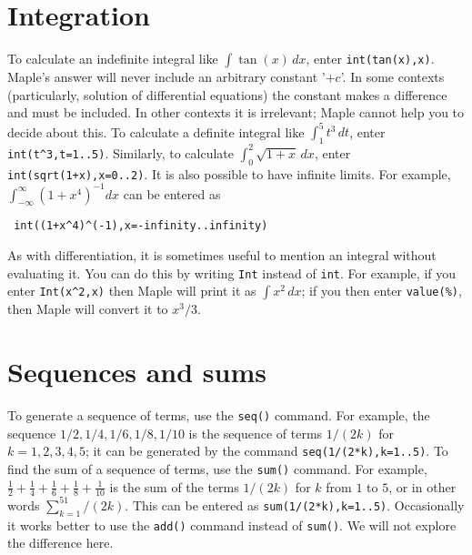 \documentclass{amsart}
\begin{document}
\section{Integration}\label{sec-int}
\setcounter{notecounter}{0}


\begin{itemize}
%
  To calculate an indefinite integral like
  $\int\tan(x)\,dx$, enter \verb~int(tan(x),x)~. 
%
  Maple's answer will never include an arbitrary
  constant '$+c$'.  In some contexts (particularly, solution
  of differential equations) the constant makes a
  difference and must be included.  In other contexts it
  is irrelevant; Maple cannot help you to decide about
  this. 
%
  To calculate a definite integral like
  $\int_1^5t^3\,dt$, enter \verb~int(t^3,t=1..5)~. 
  Similarly, to calculate $\int_0^2\sqrt{1+x}\,dx$, enter
  \verb~int(sqrt(1+x),x=0..2)~. 
%
  It is also possible to have infinite limits.  For
  example, $\int_{-\infty}^\infty (1+x^4)^{-1}dx$ can be 
  entered as 
\begin{verbatim}
 int((1+x^4)^(-1),x=-infinity..infinity)
\end{verbatim}
%
  As with differentiation, it is sometimes useful to
  mention an integral without evaluating it.  You can do
  this by writing \verb~Int~ instead of \verb~int~.  For
  example, if you enter \verb~Int(x^2,x)~ then Maple will
  print it as $\int x^2\,dx$; if you then enter
  \verb~value(%)~, then Maple will convert it to $x^3/3$. 
\end{itemize}

\section{Sequences and sums}
\setcounter{notecounter}{0}


\begin{itemize}
%
  To generate a sequence of terms, use the \verb~seq()~
  command.  For example, the sequence $1/2,1/4,1/6,1/8,1/10$
  is the sequence of terms $1/(2k)$ for $k=1,2,3,4,5$; it can
  be generated by the command \verb~seq(1/(2*k),k=1..5)~. 
%
  To find the sum of a sequence of terms, use the
  \verb~sum()~ command.  For example,
  $\tfrac{1}{2}+\tfrac{1}{4}+\tfrac{1}{6}+\tfrac{1}{8}+\tfrac{1}{10}$  
  is the sum of the terms $1/(2k)$ for $k$ from $1$ to $5$,
  or in other words $\sum_{k=1}^51/(2k)$.  This can be
  entered as \verb~sum(1/(2*k),k=1..5)~. 
%
  Occasionally it works better to use the \verb~add()~
  command instead of \verb~sum()~.  We will not explore the
  difference here. 
\end{itemize}
\end{document}
